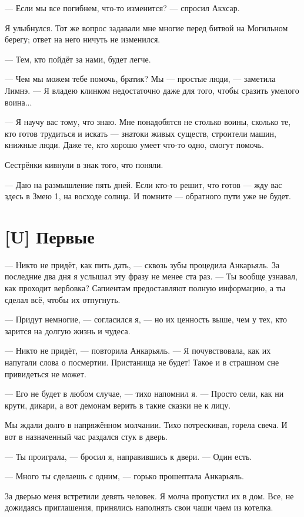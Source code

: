 --- Если мы все погибнем, что-то изменится? --- спросил Акхсар.

Я улыбнулся.
Тот же вопрос задавали мне многие перед битвой на Могильном берегу;
ответ на него ничуть не изменился.

--- Тем, кто пойдёт за нами, будет легче.

--- Чем мы можем тебе помочь, братик?
Мы --- простые люди, --- заметила Лимнэ.
--- Я владею клинком недостаточно даже для того, чтобы сразить умелого воина...

--- Я научу вас тому, что знаю.
Мне понадобятся не столько воины, сколько те, кто готов трудиться и искать --- знатоки живых существ, строители машин, книжные люди.
Даже те, кто хорошо умеет что-то одно, смогут помочь.

Сестрёнки кивнули в знак того, что поняли.

--- Даю на размышление пять дней.
Если кто-то решит, что готов --- жду вас здесь в Змею 1, на восходе солнца.
И помните --- обратного пути уже не будет.

\section{[U] Первые}

--- Никто не придёт, как пить дать, --- сквозь зубы процедила Анкарьяль.
За последние два дня я услышал эту фразу не менее ста раз.
--- Ты вообще узнавал, как проходит вербовка?
Сапиентам предоставляют полную информацию, а ты сделал всё, чтобы их отпугнуть.

--- Придут немногие, --- согласился я, --- но их ценность выше, чем у тех, кто зарится на долгую жизнь и чудеса.

--- Никто не придёт, --- повторила Анкарьяль.
--- Я почувствовала, как их напугали слова о посмертии.
Пристанища не будет!
Такое и в страшном сне привидеться не может.

--- Его не будет в любом случае, --- тихо напомнил я.
--- Просто сели, как ни крути, дикари, а вот демонам верить в такие сказки не к лицу.

Мы ждали долго в напряжённом молчании.
Тихо потрескивая, горела свеча.
И вот в назначенный час раздался стук в дверь.

--- Ты проиграла, --- бросил я, направившись к двери.
--- Один есть.

--- Много ты сделаешь с одним, --- горько прошептала Анкарьяль.

За дверью меня встретили девять человек.
Я молча пропустил их в дом.
Все, не дожидаясь приглашения, принялись наполнять свои чаши чаем из котелка.

